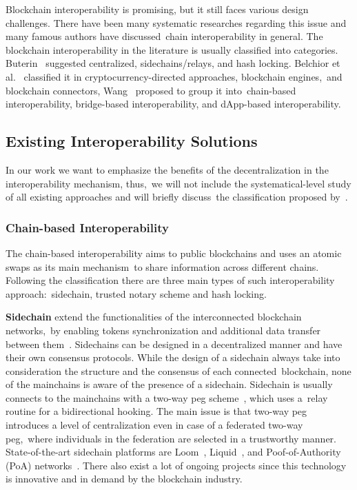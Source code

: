 Blockchain interoperability is promising, but it still faces various design
challenges.
There have been many systematic researches regarding this issue and many famous authors have discussed\
chain interoperability in general.
The blockchain interoperability in the literature is usually classified into categories.
Buterin~\cite{buterin2016} suggested centralized, sidechains/relays, and hash locking.
Belchior et al.~\cite{belchior2021survey} classified it in cryptocurrency-directed approaches, blockchain engines,\
and blockchain connectors, Wang~\cite{cryptoeprint:2021/537} proposed to group it into\
chain-based interoperability, bridge-based interoperability, and dApp-based interoperability.

\subsection{Existing Interoperability Solutions}\label{subsec:interoperability-categories}
In our work we want to emphasize the benefits of the decentralization in the interoperability mechanism, thus,\
we will not include the systematical-level study of all existing approaches and will briefly discuss\
the classification proposed by~\cite{cryptoeprint:2021/537}.

\subsubsection{Chain-based Interoperability}
The chain-based interoperability aims to public blockchains and uses an atomic swaps as its main mechanism\
to share information across different chains.
Following the classification there are three main types of such interoperability approach:\
sidechain, trusted notary scheme and hash locking.

\textbf{Sidechain} extend the functionalities of the interconnected blockchain networks,\
by enabling tokens synchronization and additional data transfer between them~\cite{Parizi2019}.
Sidechains can be designed in a decentralized manner and have their own consensus protocols.
While the design of a sidechain always take into consideration the structure and the consensus of each connected\
blockchain, none of the mainchains is aware of the presence of a sidechain.
Sidechain is usually connects to the mainchains with a two-way peg scheme~\cite{SINGH2020102471}, which uses a\
relay routine for a bidirectional hooking.
The main issue is that two-way peg introduces a level of centralization even in case of a federated two-way peg,\
where individuals in the federation are selected in a trustworthy manner.
State-of-the-art sidechain platforms are Loom~\cite{Loom2019}, Liquid~\cite{Nick2020LiquidAB},
and Poof-of-Authority (PoA) networks~\cite{POA2018}.
There also exist a lot of ongoing projects since this technology is innovative and in demand by the blockchain industry.

